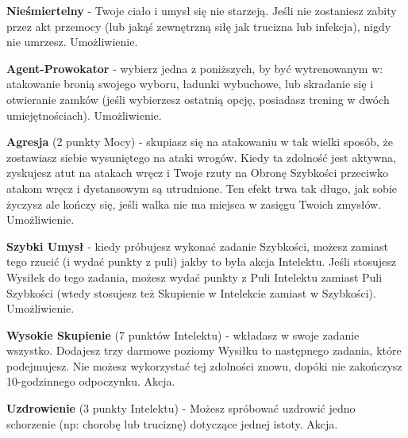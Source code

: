 \textbf{Nieśmiertelny}\label{sec:Nieśmiertelny} - Twoje ciało i umysł się nie starzeją. Jeśli nie zostaniesz zabity przez akt przemocy (lub jakąś zewnętrzną siłę jak trucizna lub infekcja), nigdy nie umrzesz. Umożliwienie.  

\textbf{Agent-Prowokator}\label{sec:Agent-Prowokator} - wybierz jedna z poniższych, by być wytrenowanym w: atakowanie bronią swojego wyboru, ładunki wybuchowe, lub skradanie się i otwieranie zamków (jeśli wybierzesz ostatnią opcję, posiadasz trening w dwóch umiejętnościach). Umożliwienie.

\textbf{Agresja}\label{sec:Agresja} (2 punkty Mocy) - skupiasz się na atakowaniu w tak wielki sposób, że zostawiasz siebie wysuniętego na ataki wrogów. Kiedy ta zdolność jest aktywna, zyskujesz atut na atakach wręcz i Twoje rzuty na Obronę Szybkości przeciwko atakom wręcz i dystansowym są utrudnione. Ten efekt trwa tak długo, jak sobie życzysz ale kończy się, jeśli walka nie ma miejsca w zasięgu Twoich zmysłów. Umożliwienie.

\textbf{Szybki Umysł}\label{sec:Szybki Umysł} - kiedy próbujesz wykonać zadanie Szybkości, możesz zamiast tego rzucić (i wydać punkty z puli) jakby to była akcja Intelektu. Jeśli stosujesz Wysiłek do tego zadania, możesz wydać punkty z Puli Intelektu zamiast Puli Szybkości (wtedy stosujesz też Skupienie w Intelekcie zamiast w Szybkości). Umożliwienie. 

\textbf{Wysokie Skupienie}\label{sec:Wysokie Skupienie} (7 punktów Intelektu) - wkładasz w swoje zadanie wszystko. Dodajesz trzy darmowe poziomy Wysiłku to następnego zadania, które podejmujesz. Nie możesz wykorzystać tej zdolności znowu, dopóki nie zakończysz 10-godzinnego odpoczynku. Akcja.

\textbf{Uzdrowienie}\label{sec:Uzdrowienie} (3 punkty Intelektu) - Możesz spróbować uzdrowić jedno schorzenie (np: chorobę lub truciznę) dotyczące jednej istoty. Akcja.

